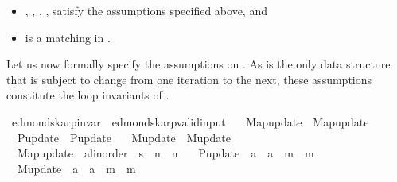 \begin{isabellebody}
\begin{isamarkuptext}
%
\begin{itemize}%
\item {}, , , ,  satisfy the assumptions specified above, and

\item {} is a matching in .%
\end{itemize}


Let us now formally specify the assumptions on . As  is the only data structure
that is subject to change from one iteration to the next, these assumptions constitute the loop
invariants of .%
\end{isamarkuptext}\isamarkuptrue%
\isamarkupfalse%
\ edmonds{\isacharunderscore}{\kern0pt}karp{\isacharunderscore}{\kern0pt}invar\ {\isacharequal}{\kern0pt}\ edmonds{\isacharunderscore}{\kern0pt}karp{\isacharunderscore}{\kern0pt}valid{\isacharunderscore}{\kern0pt}input\ \isanewline
\ \ Map{\isacharunderscore}{\kern0pt}update\ {\isacharequal}{\kern0pt}\ Map{\isacharunderscore}{\kern0pt}update\ \isanewline
\ \ P{\isacharunderscore}{\kern0pt}update\ {\isacharequal}{\kern0pt}\ P{\isacharunderscore}{\kern0pt}update\ \isanewline
\ \ M{\isacharunderscore}{\kern0pt}update\ {\isacharequal}{\kern0pt}\ M{\isacharunderscore}{\kern0pt}update\ \isanewline
\ \ Map{\isacharunderscore}{\kern0pt}update\ {\isacharcolon}{\kern0pt}{\isacharcolon}{\kern0pt}\ {\isachardoublequoteopen}{\isacharprime}{\kern0pt}a{\isacharcolon}{\kern0pt}{\isacharcolon}{\kern0pt}linorder\ {\isasymRightarrow}\ {\isacharprime}{\kern0pt}s\ {\isasymRightarrow}\ {\isacharprime}{\kern0pt}n\ {\isasymRightarrow}\ {\isacharprime}{\kern0pt}n{\isachardoublequoteclose}\ \isanewline
\ \ P{\isacharunderscore}{\kern0pt}update\ {\isacharcolon}{\kern0pt}{\isacharcolon}{\kern0pt}\ {\isachardoublequoteopen}{\isacharprime}{\kern0pt}a\ {\isasymRightarrow}\ {\isacharprime}{\kern0pt}a\ {\isasymRightarrow}\ {\isacharprime}{\kern0pt}m\ {\isasymRightarrow}\ {\isacharprime}{\kern0pt}m{\isachardoublequoteclose}\ \isanewline
\ \ M{\isacharunderscore}{\kern0pt}update\ {\isacharcolon}{\kern0pt}{\isacharcolon}{\kern0pt}\ {\isachardoublequoteopen}{\isacharprime}{\kern0pt}a\ {\isasymRightarrow}\ {\isacharprime}{\kern0pt}a\ {\isasymRightarrow}\ {\isacharprime}{\kern0pt}m\ {\isasymRightarrow}\ {\isacharprime}{\kern0pt}m{\isachardoublequoteclose}\ {\isacharplus}{\kern0pt}\isanewline

\end{isabellebody}
